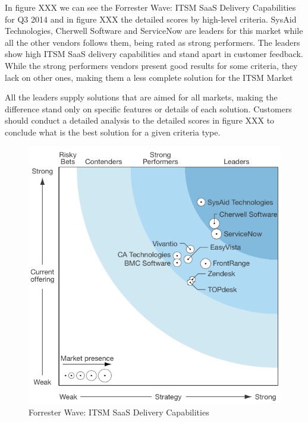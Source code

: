 In figure XXX we can see the Forrester Wave: ITSM SaaS Delivery Capabilities for Q3 2014 and in figure XXX the detailed scores by high-level criteria. SysAid Technologies, Cherwell Software and ServiceNow are leaders for this market while all the other vendors follows them, being rated as strong performers. The leaders show high ITSM SaaS delivery capabilities and stand apart in customer feedback. While the strong performers vendors present good results for some criteria, they lack on other ones, making them a less complete solution for the ITSM Market\par
All the leaders supply solutions that are aimed for all markets, making the difference stand only on specific features or details of each solution. Customers should conduct a detailed analysis to the detailed scores in figure XXX to conclude what is the best solution for a given criteria type.\par

\begin{figure}
\centering
\includegraphics{img/ForresterWaveITSM.png}
\caption{Forrester Wave: ITSM SaaS Delivery Capabilities}
\end{figure}

